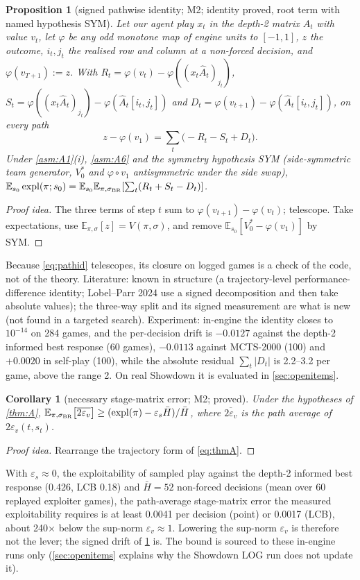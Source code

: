 \documentclass[10pt]{article}
\theoremstyle{plain}
\newtheorem{proposition}[theorem]{Proposition}
\newtheorem{corollary}[theorem]{Corollary}
\theoremstyle{definition}
\theoremstyle{remark}
\newcommand{\E}{\mathbb{E}}
\DeclareMathOperator{\expl}{expl}
\newcommand{\epss}{\varepsilon_s}
\newcommand{\epsv}{\varepsilon_v}
\newcommand{\Hbar}{\bar H}
\newcommand{\Ahat}{\hat A}
\begin{document}
\begin{proposition}[signed pathwise identity; M2; identity proved, root term with named hypothesis SYM]\label{prop:pathid}
Let our agent play $x_t$ in the depth-2 matrix $\Ahat_t$ with value $v_t$, let $\varphi$ be any odd monotone map of engine
units to $[-1,1]$, $z$ the outcome, $i_t,j_t$ the realised row and column at a non-forced decision, and $\varphi(v_{T+1}):=z$. With
$R_t=\varphi(v_t)-\varphi((x_t\Ahat_t)_{j_t})$, $S_t=\varphi((x_t\Ahat_t)_{j_t})-\varphi(\Ahat_t[i_t,j_t])$ and
$D_t=\varphi(v_{t+1})-\varphi(\Ahat_t[i_t,j_t])$, on every path
\begin{equation}\label{eq:pathid}
z-\varphi(v_1)=\sum_t\big(-R_t-S_t+D_t\big).
\end{equation}
Under \cref{asm:A1}(i), \cref{asm:A6} and the symmetry hypothesis SYM (side-symmetric team generator, $V^*_0$ and
$\varphi\circ v_1$ antisymmetric under the side swap), $\E_{s_0}\expl(\pi;s_0)=\E_{s_0}\E_{\pi,\sigma_{\rm BR}}[\sum_t(R_t+S_t-D_t)]$.
\end{proposition}
\begin{proof}[Proof idea] The three terms of step $t$ sum to $\varphi(v_{t+1})-\varphi(v_t)$; telescope. Take expectations,
use $\E_{\pi,\sigma}[z]=V(\pi,\sigma)$, and remove $\E_{s_0}[V^*_0-\varphi(v_1)]$ by SYM. \end{proof}
Because \cref{eq:pathid} telescopes, its closure on logged games is a check of the code, not of the theory. Literature:
known in structure (a trajectory-level performance-difference identity; Lobel--Parr 2024 use a signed decomposition and
then take absolute values); the three-way split and its signed measurement are what is new (not found in a targeted
search). Experiment: in-engine the identity closes to $10^{-14}$ on 284 games, and the per-decision drift is $-0.0127$
against the depth-2 informed best response (60 games), $-0.0113$ against MCTS-2000 (100) and $+0.0020$ in self-play (100), while
the absolute residual $\sum_t|D_t|$ is 2.2--3.2 per game, above the range 2. On real Showdown it is evaluated in
\cref{sec:openitems}.

\begin{corollary}[necessary stage-matrix error; M2; proved]\label{cor:epsvlb}
Under the hypotheses of \cref{thm:A}, $\E_{\pi,\sigma_{\rm BR}}\big[\overline{2\epsv}\big]\ge(\expl(\pi)-\epss\Hbar)/\Hbar$, where
$\overline{2\epsv}$ is the path average of $2\epsv(t,s_t)$.
\end{corollary}
\begin{proof}[Proof idea] Rearrange the trajectory form of \cref{eq:thmA}. \end{proof}
With $\epss\approx0$, the exploitability of sampled play against the depth-2 informed best response (0.426, LCB 0.18) and $\Hbar=52$ non-forced decisions
(mean over 60 replayed exploiter games), the path-average stage-matrix error the measured exploitability requires is at least
0.0041 per decision (point) or 0.0017 (LCB), about 240$\times$ below the sup-norm $\epsv\approx1$. Lowering the sup-norm
$\epsv$ is therefore not the lever; the signed drift of \cref{prop:pathid} is. The bound is sourced to these
in-engine runs only (\cref{sec:openitems} explains why the Showdown LOG run does not update it).
\end{document}
